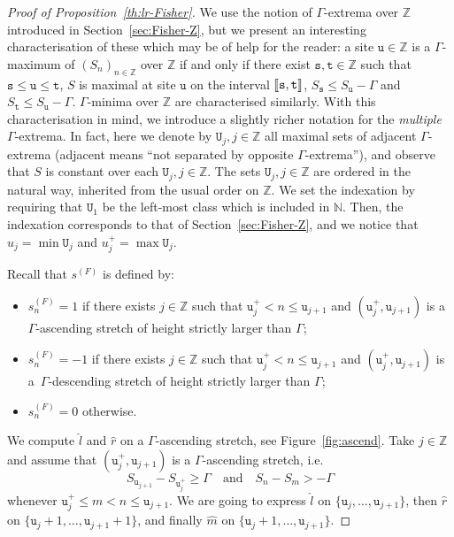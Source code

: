 \documentclass[AHL,Unicode,longabstracts,published]{cedram}
\newcommand{\N}{\mathbb{N}}
\newcommand{\bbZ}{\mathbb{Z}}
\newcommand{\gG}{\Gamma}
\renewcommand*\ss{\mathtt{u}}
\newcommand{\ttt}{\mathtt{t}}
\newcommand{\tu}{\ss}
\newcommand{\tU}{\mathtt{U}}
\newcommand{\ts}{\mathtt{s}}
\newcommand{\ls}{\widehat{l}}
\newcommand{\rs}{\widehat{r}}
\newcommand{\ms}{\widehat{m}}
\newcommand{\llbracket}{\mathopen{[\mkern -2.7mu[}}
\newcommand{\rrbracket}{\mathclose{]\mkern -2.7mu]}}
\newcommand{\lbra}{\llbracket}
\newcommand{\rbra}{\rrbracket}
\begin{document}
\begin{proof}[Proof of Proposition~\ref{th:lr-Fisher}]
{We use the notion of $\gG$-extrema over $\bbZ$ introduced in Section~\ref{sec:Fisher-Z}, but we present an interesting characterisation of these which may be of help for the reader: a site $\tu\in\bbZ$ is a $\gG$-maximum of $(S_n)_{n\in\bbZ}$ over $\bbZ$ if and only if there exist $\ts, \ttt\in\bbZ$ such that $\ts\le \tu\le \ttt$, $S$ is maximal at site $\tu$ on the interval $\lbra\ts, \ttt\rbra$, $S_{\ts}\le S_{\tu}-\gG$ and $S_{\ttt}\le S_{\tu}-\gG$. $\gG$-minima over $\bbZ$ are characterised similarly. With this characterisation in mind, we introduce a slightly richer notation for the \emph{multiple} $\gG$-extrema.} In fact, here we denote by $\tU_j, j\in\bbZ$ all maximal sets of adjacent $\gG$-extrema (adjacent means ``not separated by opposite $\gG$-extrema''), and observe that $S$ is constant over each $\tU_j, j\in\bbZ$. The sets $\tU_j, j\in\bbZ$ are ordered in the natural way, inherited from the usual order on $\bbZ$. We set the indexation by requiring that $\tU_1$ be the left-most class which is included in $\N$. Then, the indexation corresponds to that of Section~\ref{sec:Fisher-Z}, and we notice that $u_j=\min \tU_j$ and $u_j^+=\max \tU_j$.

\pagebreak
Recall that $s^{(F)}$ is defined by:
\begin{itemize}
\item $s^{(F)}_n=1$ if there exists $j\in\bbZ$ such that $\tu_j^+< n\le \tu_{j+1}$ and $(\tu_j^+, \tu_{j+1})$ is a~$\gG$-ascending stretch of height strictly larger than $\gG$;
\item $s^{(F)}_n=-1$ if there exists $j\in\bbZ$ such that $\tu_j^+< n\le \tu_{j+1}$ and $(\tu_j^+, \tu_{j+1})$ is a~$\gG$-descending stretch of height strictly larger than $\gG$;
\item $s^{(F)}_n=0$ otherwise.
\end{itemize}

We compute $\ls$ and $\rs$ on a $\gG$-ascending stretch, see Figure~\ref{fig:ascend}. Take $j\in\bbZ$ and assume that $(\tu_j^+, \tu_{j+1})$ is a $\gG$-ascending stretch, i.e.
\[
S_{\tu_{j+1}}-S_{\tu_j^+}\ge \gG\quad\text{and} \quad S_n-S_m> -\gG
\]
whenever $\tu_j^+\le m<n\le \tu_{j+1}$. We are going to express $\ls$ on $\{\tu_j, \dots, \tu_{j+1}\}$, then $\rs$ on $\{\tu_j+1, \dots, \tu_{j+1}+1\}$, and finally $\ms$ on $\{\tu_j+1, \dots, \tu_{j+1}\}$.


\end{proof}
\end{document}
